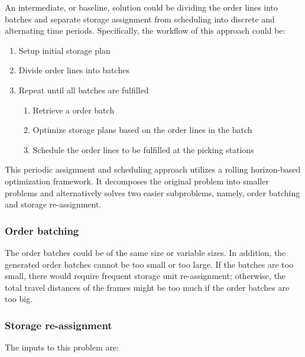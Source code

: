 \documentclass[a4, 11pt]{article}
\begin{document}
An intermediate, or baseline, solution could be dividing the order lines into batches and separate storage assignment from scheduling into discrete and alternating time periods.
Specifically, the workflow of this approach could be:

\begin{enumerate}
	\item Setup initial storage plan
	\item Divide order lines into batches
	\item Repeat until all batches are fulfilled
		\begin{enumerate}
			\item Retrieve a order batch
			\item Optimize storage plans based on the order lines in the batch
			\item Schedule the order lines to be fulfilled at the picking stations
		\end{enumerate}
\end{enumerate}

This periodic assignment and scheduling approach utilizes a rolling horizon-based optimization framework.
It decomposes the original problem into smaller problems and alternatively solves two easier subproblems, namely, order batching and storage re-assignment.

\subsubsection{Order batching}

The order batches could be of the same size or variable sizes.
In addition, the generated order batches cannot be too small or too large.
If the batches are too small, there would require frequent storage unit re-assignment; otherwise, the total travel distances of the frames might be too much if the order batches are too big.

\subsubsection{Storage re-assignment}


The inputs to this problem are:
\end{document}
